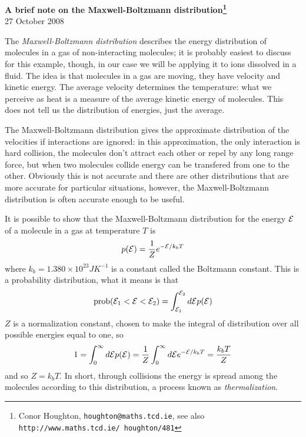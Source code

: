 \documentclass[12pt]{article}
\begin{document}
\begin{center}
{\bf A brief note on the Maxwell-Boltzmann distribution\footnote{Conor Houghton, {\tt houghton@maths.tcd.ie},
see also {\tt http://www.maths.tcd.ie/ houghton/481}}}\\[1cm]{} 27 October 2008
\end{center}
The {\sl Maxwell-Boltzmann distribution} describes the energy
distribution of molecules in a gas of non-interacting molecules; it is
probably easiest to discuss for this example, though, in our case we
will be applying it to ions dissolved in a fluid. The idea is that
molecules in a gas are moving, they have velocity and kinetic
energy. The average velocity determines the temperature: what we
perceive as heat is a measure of the average kinetic energy of
molecules. This does not tell us the distribution of energies, just
the average.

The Maxwell-Boltzmann distribution gives the approximate distribution of the
velocities if interactions are ignored: in this approximation, the
only interaction is hard collision, the molecules don't attract each
other or repel by any long range force, but when two molecules collide
energy can be transfered from one to the other. Obviously this is not
accurate and there are other distributions that are more
accurate for particular situations, however, the Maxwell-Boltzmann
distribution is often accurate enough to be useful.

It is possible to show that the Maxwell-Boltzmann distribution for the energy ${\cal E}$ of a molecule in a gas at temperature $T$ is
\begin{equation}
p({\cal E})=\frac{1}{Z}e^{-{\cal E}/k_bT}
\end{equation}
where $k_b=1.380\times 10^23 JK^{-1}$ is a constant called the Boltzmann constant. This is a probability distribution, what it means is that
\begin{equation}
\mbox{prob}({\cal E}_1<{\cal E}<{\cal E}_2)=\int_{{\cal E}_1}^{{\cal E}_2}{d{\cal E}p({\cal E})}
\end{equation}
$Z$ is a normalization constant, chosen to make the integral of distribution over all possible energies equal to one, so
\begin{equation}
1=\int_0^\infty{d{\cal E}p({\cal E})}=\frac{1}{Z}\int_0^\infty{d{\cal E}e^{-{\cal E}/k_bT}}=\frac{k_bT}{Z}
\end{equation}
and so $Z=k_bT$. In short, through collisions the energy is spread among the
molecules according to this distribution, a process known as {\sl thermalization}.
\end{document}
